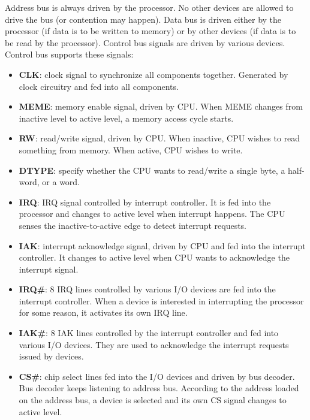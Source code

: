 \documentclass[oneside]{book}
\begin{document}
Address bus is always driven by the processor. No other devices are allowed to
drive the bus (or contention may happen). Data bus is driven either by the
processor (if data is to be written to memory) or by other devices (if 
data is to be read by the processor). Control bus signals are driven by
various devices. Control bus supports these signals:

\begin{itemize}

\item \textbf{CLK}: clock signal to synchronize all components together. Generated
by clock circuitry and fed into all components.

\item \textbf{MEME}: memory enable signal, driven by CPU. When MEME changes from
inactive level to active level, a memory access cycle starts.

\item \textbf{RW}: read/write signal, driven by CPU. When inactive, CPU wishes to
read something from memory. When active, CPU wishes to write.

\item \textbf{DTYPE}: specify whether the CPU wants to read/write a single byte,
a half-word, or a word.

\item \textbf{IRQ}: IRQ signal controlled by interrupt controller. It is fed
into the processor and changes to active level when interrupt happens. The CPU
senses the inactive-to-active edge to detect interrupt requests.

\item \textbf{IAK}: interrupt acknowledge signal, driven by CPU and fed into
the interrupt controller. It changes
to active level when CPU wants to acknowledge the interrupt signal.

\item \textbf{IRQ\#}: 8 IRQ lines controlled by various I/O devices are fed into
the interrupt controller. When a device is interested in interrupting the 
processor for some reason, it activates its own IRQ line. 

\item \textbf{IAK\#}: 8 IAK lines controlled by the interrupt controller and fed
into various I/O devices. They are used to acknowledge the interrupt requests
issued by devices.

\item \textbf{CS\#}: chip select lines fed into the I/O devices and driven by
bus decoder. Bus decoder keeps listening to address bus. According to the
address loaded on the address bus, a device is selected and its own CS signal
changes to active level.

\end{itemize}
\end{document}
